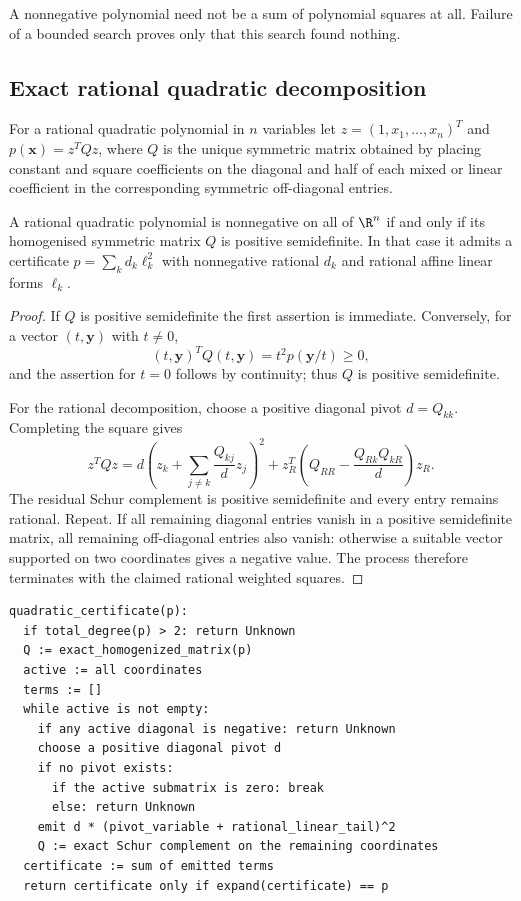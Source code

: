 \begin{remark}
A nonnegative polynomial need not be a sum of polynomial squares at all. Failure
of a bounded search proves only that this search found nothing.
\end{remark}

\subsection{Exact rational quadratic decomposition}
\label{sec:quadratic}

For a rational quadratic polynomial in $n$ variables let
$z=(1,x_1,\ldots,x_n)^{T}$ and $p(\bm x)=z^{T}Qz$, where $Q$ is the unique
symmetric matrix obtained by placing constant and square coefficients on the
diagonal and half of each mixed or linear coefficient in the corresponding
symmetric off-diagonal entries.

\begin{theorem}
\label{thm:quadratic}
A rational quadratic polynomial is nonnegative on all of $\R^n$ if and only if
its homogenised symmetric matrix $Q$ is positive semidefinite. In that case it
admits a certificate $p=\sum_k d_k\ell_k^2$ with nonnegative rational $d_k$ and
rational affine linear forms $\ell_k$.
\end{theorem}
\begin{proof}
If $Q$ is positive semidefinite the first assertion is immediate. Conversely,
for a vector $(t,\bm y)$ with $t\ne0$,
\[
 (t,\bm y)^{T}Q(t,\bm y)=t^2p(\bm y/t)\ge0,
\]
and the assertion for $t=0$ follows by continuity; thus $Q$ is positive
semidefinite.

For the rational decomposition, choose a positive diagonal pivot $d=Q_{kk}$.
Completing the square gives
\[
 z^{T}Qz=d\left(z_k+\sum_{j\ne k}\frac{Q_{kj}}{d}z_j\right)^2
    +z_R^{T}\!\left(Q_{RR}-\frac{Q_{Rk}Q_{kR}}{d}\right)z_R .
\]
The residual Schur complement is positive semidefinite and every entry remains
rational. Repeat. If all remaining diagonal entries vanish in a positive
semidefinite matrix, all remaining off-diagonal entries also vanish: otherwise a
suitable vector supported on two coordinates gives a negative value. The process
therefore terminates with the claimed rational weighted squares.
\end{proof}

\begin{lstlisting}
quadratic_certificate(p):
  if total_degree(p) > 2: return Unknown
  Q := exact_homogenized_matrix(p)
  active := all coordinates
  terms := []
  while active is not empty:
    if any active diagonal is negative: return Unknown
    choose a positive diagonal pivot d
    if no pivot exists:
      if the active submatrix is zero: break
      else: return Unknown
    emit d * (pivot_variable + rational_linear_tail)^2
    Q := exact Schur complement on the remaining coordinates
  certificate := sum of emitted terms
  return certificate only if expand(certificate) == p
\end{lstlisting}

